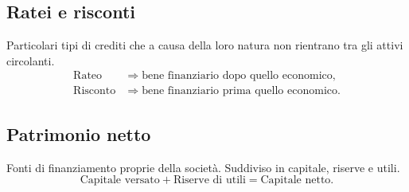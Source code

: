 \documentclass[11pt,a4paper]{article}
\begin{document}
\subsection*{Ratei e risconti}
Particolari tipi di crediti che a causa della loro natura non rientrano tra gli attivi circolanti.
\begin{align*}
\text{Rateo}&\Rightarrow\text{bene finanziario dopo quello economico},\\
\text{Risconto}&\Rightarrow\text{bene finanziario prima quello economico}.
\end{align*}
\subsection*{Patrimonio netto}
Fonti di finanziamento proprie della società. Suddiviso in capitale, riserve e utili.
\[\text{Capitale versato}+\text{Riserve di utili}=\text{Capitale netto}.\]
\end{document}
